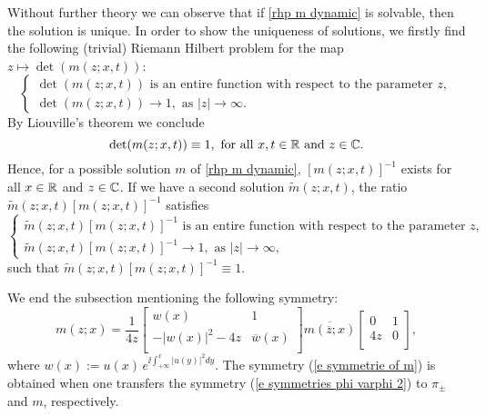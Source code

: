 \begin{rem}\label{r uniqueness + det=1}
    Without further theory we can observe that if \rh \ref{rhp m dynamic} is solvable, then the solution is unique. In order to show the uniqueness of solutions, we firstly find the following (trivial) Riemann Hilbert problem for the map $z\mapsto \det(m(z;x,t))$:
    \begin{equation*}
        \left\{
           \begin{array}{ll}
             \det(m(z;x,t))\text{ is an entire function with respect to the parameter }z,\\
             \det(m(z;x,t))\to 1,\text{ as }|z|\to\infty.
           \end{array}
         \right.
    \end{equation*}
    By Liouville's theorem we conclude
    \begin{equation}\label{e det m=1}
        \det(m(z;x,t))\equiv 1,\text{ for all }x,t\in\mathbb R\text{ and }z\in \mathbb C.
    \end{equation}
    Hence, for a possible solution $m$ of \rh \ref{rhp m dynamic}, $[m(z;x,t)]^{-1}$ exists for all $x\in\mathbb R$ and $z\in \mathbb C$. If we have a second solution $\widetilde{m}(z;x,t)$, the ratio $\widetilde{m}(z;x,t)[m(z;x,t)]^{-1}$ satisfies
    \begin{equation*}
        \left\{
           \begin{array}{ll}
             \widetilde{m}(z;x,t)[m(z;x,t)]^{-1}\text{ is an entire function with respect to the parameter }z,\\
             \widetilde{m}(z;x,t)[m(z;x,t)]^{-1}\to 1,\text{ as }|z|\to\infty,
           \end{array}
         \right.
    \end{equation*}
    such that $\widetilde{m}(z;x,t)[m(z;x,t)]^{-1}\equiv 1$.
\end{rem}
We end the subsection mentioning the following symmetry:
\begin{equation}\label{e symmetrie of m}
    m(z;x)=\frac{1}{4z}
    \left[
      \begin{array}{cc}
        w(x) & 1 \\
        -|w(x)|^2-4z & \overline{w}(x) \\
      \end{array}
    \right]
    \overline{m(\overline{z};x)}
    \left[
      \begin{array}{cc}
        0 & 1 \\
        4z & 0 \\
      \end{array}
    \right],
\end{equation}
where $w(x):= u(x)\,e^{\ii\int^x_{+\infty}|u(y)|^2dy}$. The symmetry (\ref{e symmetrie of m}) is obtained when one transfers the symmetry (\ref{e symmetries phi varphi 2}) to $\pi_{\pm}$ and $m$, respectively. 